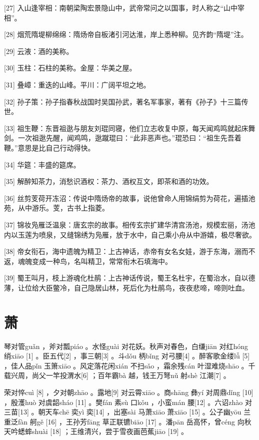 \documentclass[12pt,UTF8]{ctexbook}
\begin{document}
[27] 入山逢宰相：南朝梁陶宏景隐山中，武帝常问之以国事，时人称之“山中宰相”。

[28] 烟荒隋堤柳绵绵：隋炀帝自板渚引河达淮，岸上悉种柳。见齐韵“隋堤”注。

[29] 云液：酒的美称。

[30] 玉柱：石柱的美称。金屋：华美之屋。

[31] 叠嶂：重迭的山峰。平川：广阔平坦之地。

[32] 孙子策：孙子指春秋战国时吴国孙武，著名军事家，著有《孙子》十三篇传世。

[33] 祖生鞭：东晋祖逖与朋友刘琨同寝，他们立志收复中原，每天闻鸡鸣就起床舞剑。一次祖逖先醒，闻鸡鸣，逖蹴琨曰：“此非恶声也。”琨恐曰：“祖生先吾着鞭。”意思是比自己行动得快。

[34] 华筵：丰盛的筵席。

[35] 解醉知茶力，消愁识酒权：茶力、酒权互文，即茶和酒的功效。

[36] 丝剪芰荷开冻沼：传说中隋炀帝的故事，说他曾命人用锦绢剪为荷花，遍插池苑，从中游乐。芰，古书上指菱。

[37] 锦妆凫雁泛温泉：唐玄宗的故事。相传玄宗扩建华清宫汤池，规模宏丽，汤池内以玉莲为喷泉，又缝锦绣为凫雁，放于水中，自己乘小舟从中游嬉，极尽奢欲。

[38] 帝女衔石，海中遗魄为精卫：上古神话，赤帝有女名女娃，游于东海，溺而不返，魂魄变成一种鸟，名叫精卫，常常衔木石填海中。

[39] 蜀王叫月，枝上游魂化杜鹃：上古神话传说，蜀王名杜宇，在蜀治水，自以德薄，让位给大臣鳖冷，自己隐居山林，死后化为杜鹃鸟，夜夜悲啼，啼则吐血。





\chapter{萧}


琴对管guǎn ，斧对瓢piáo 。水怪guài 对花妖。秋声对春色，白缣jiān 对红hóng 绡xiāo [1] 。臣五代[2] ，事三朝[3] 。斗dǒu 柄bǐng 对弓腰[4] 。醉客歌金缕lǚ [5] ，佳人品pǐn 玉箫xiāo 。风定落花闲xián 不扫sǎo ，霜余残cán 叶湿难烧shāo 。千载兴周，尚父一竿投渭水[6] ；百年霸bà 越，钱王万弩nǔ 射shè 江潮[7] 。

荣对悴cuì [8] ，夕对朝zhāo 。露地[9] 对云霄xiāo 。商shāng 彝yí 对周鼎dǐng [10] ，殷濩huò 对虞韶sháo [11] 。樊fán 素sù 口kǒu ，小蛮mán 腰[12] 。六诏zhào 对三苗[13] 。朝天车chē 奕yì 奕[14] ，出塞sài 马萧xiāo 萧xiāo [15] 。公子幽yōu 兰重泛fàn 舸gě [16] ，王孙芳fāng 草正联镳biāo [17] 。潘pān 岳高怀，曾céng 向秋天吟蟋蟀shuài [18] ；王维清兴，尝于雪夜画芭蕉jiāo [19] 。
\end{document}
